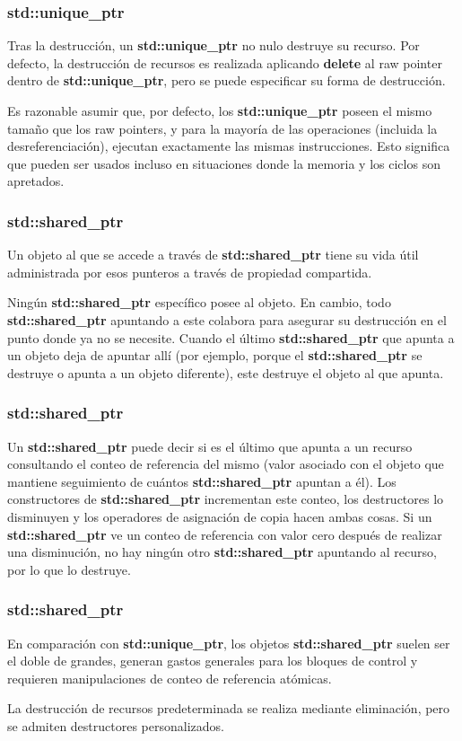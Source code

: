 \documentclass{beamer}
\begin{document}
	\begin{frame}
		\frametitle{std::unique\_ptr}
		Tras la destrucción, un \textbf{std::unique\_ptr} no nulo destruye su recurso. Por defecto, la destrucción de recursos es realizada aplicando \textbf{delete} al raw pointer dentro de \textbf{std::unique\_ptr}, pero se puede especificar su forma de destrucci\'on.
		
		Es razonable asumir que, por defecto, los \textbf{std::unique\_ptr} poseen el mismo tamaño que los raw pointers, y para la mayoría de las operaciones (incluida la desreferenciación), ejecutan exactamente las mismas instrucciones. Esto significa que pueden ser usados incluso en situaciones donde la memoria y los ciclos son apretados. 
	\end{frame}

	\begin{frame}
		\frametitle{std::shared\_ptr}
		Un objeto al que se accede a través de \textbf{std::shared\_ptr} tiene su vida útil administrada por esos punteros a través de propiedad compartida. 
		
		Ningún \textbf{std::shared\_ptr} específico posee al objeto. En cambio, todo \textbf{std::shared\_ptr} apuntando a este colabora para asegurar su destrucción en el punto donde ya no se necesite. Cuando el último \textbf{std::shared\_ptr} que apunta a un objeto deja de apuntar allí (por ejemplo, porque el \textbf{std::shared\_ptr} se destruye o apunta a un objeto diferente), este destruye el objeto al que apunta. 
	\end{frame}
	
	\begin{frame}
		\frametitle{std::shared\_ptr} 
		Un \textbf{std::shared\_ptr} puede decir si es el último que apunta a un recurso consultando el conteo de referencia del mismo (valor asociado con el objeto que mantiene seguimiento de cuántos \textbf{std::shared\_ptr} apuntan a él). Los constructores de \textbf{std::shared\_ptr} incrementan este conteo, los destructores lo disminuyen y los operadores de asignación de copia hacen ambas cosas. Si un \textbf{std::shared\_ptr} ve un conteo de referencia con valor cero después de realizar una disminución, no hay ning\'un otro \textbf{std::shared\_ptr} apuntando al recurso, por lo que lo destruye.
	\end{frame}

	\begin{frame}
		\frametitle{std::shared\_ptr}
		En comparación con \textbf{std::unique\_ptr}, los objetos \textbf{std::shared\_ptr} suelen ser el doble de grandes, generan gastos generales para los bloques de control y requieren manipulaciones de conteo de referencia at\'omicas.
		
		La destrucción de recursos predeterminada se realiza mediante eliminación, pero se admiten destructores personalizados.
	\end{frame}
\end{document}
